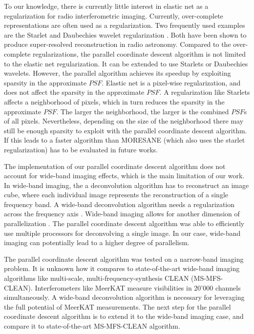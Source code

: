 To our knowledge, there is currently little interest in elastic net as a regularization for radio interferometric imaging. Currently, over-complete representations are often used as a regularization. Two frequently used examples are the Starlet \cite{starck2015starlet} and Daubechies wavelet regularization \cite{carrillo2014purify}. Both have been shown to produce super-resolved reconstruction in radio astronomy\cite{girard2015sparse, dabbech2018cygnus}. Compared to the over-complete regularizations, the parallel coordinate descent algorithm is not limited to the elastic net regularization. It can be extended to use Starlets or Daubechies wavelets. However, the parallel algorithm achieves its speedup by exploiting sparsity in the approximate $PSF$. Elastic net is a pixel-wise regularization, and does not affect the sparsity in the approximate $PSF$. A regularization like Starlets affects a neighborhood of pixels, which in turn reduces the sparsity in the approximate $PSF$. The larger the neighborhood, the larger is the combined $PSF$s of all pixels. Nevertheless, depending on the size of the neighborhood there may still be enough sparsity to exploit with the parallel coordinate descent algorithm. If this leads to a faster algorithm than MORESANE (which also uses the starlet regularization) has to be evaluated in future works.

The implementation of our parallel coordinate descent algorithm does not account for wide-band imaging effects, which is the main limitation of our work. In wide-band imaging, the a deconvolution algorithm has to reconstruct an image cube, where each individual image represents the reconstruction of a single frequency band. A wide-band deconvolution algorithm needs a regularization across the frequency axis \cite{ferrari2015multi}. Wide-band imaging allows for another dimension of parallelization \cite{ferrari2015multi}. The parallel coordinate descent algorithm was able to efficiently use multiple processors for deconvolving a single image. In our case, wide-band imaging can potentially lead to a higher degree of parallelism.

The parallel coordinate descent algorithm was tested on a narrow-band imaging problem. It is unknown how it compares to state-of-the-art wide-band imaging algorithms like multi-scale, multi-frequency-synthesis CLEAN (MS-MFS-CLEAN). Interferometers like MeerKAT measure visibilities in 20'000 channels simultaneously. A wide-band deconvolution algorithm is necessary for leveraging the full potential of MeerKAT measurements. The next step for the parallel coordinate descent algorithm is to extend it to the wide-band imaging case, and compare it to state-of-the-art MS-MFS-CLEAN algorithm.
 

